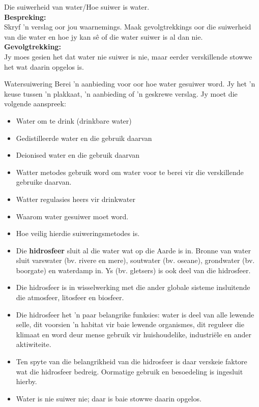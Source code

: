 \begin{g_experiment}{Die suiwerheid van water/Hoe suiwer is water.}
\\
\label{m38138*id3429827}\noindent{}\textbf{Bespreking:}\\
Skryf  'n verslag oor jou waarnemings. Maak gevolgtrekkings oor die suiwerheid van die water en hoe jy kan sê of die water suiwer is al dan nie.
\\  
\label{m38138*id68921}\noindent{}\textbf{Gevolgtrekking:}\\
Jy moes gesien het dat water nie suiwer is nie, maar eerder verskillende stowwe het wat daarin opgelos is.
\\
\end{g_experiment}
\label{m38138*id672214}
            \begin{project}{Watersuiwering}
            \nopagebreak
\label{m38138*id97324}
Berei  'n aanbieding voor oor hoe water gesuiwer word. Jy het  'n keuse tussen  'n plakkaat,  'n aanbieding of  'n geskrewe verslag. Jy moet die volgende aanspreek:
\label{m38138*id097324}\begin{itemize}[noitemsep]
            \item Water om te drink (drinkbare water)
\item Gedistilleerde water en die gebruik daarvan
\item Deionised water en die gebruik daarvan
\item Watter metodes gebruik word om water voor te berei vir die verskillende gebruike daarvan.
\item Watter regulasies heers vir drinkwater
\item Waarom water gesuiwer moet word.
\item Hoe veilig hierdie suiweringsmetodes is.
\end{itemize}
\par 
\end{project}


            \nopagebreak

\begin{itemize}[noitemsep]
\item Die \textbf{hidrosfeer} sluit al die water wat op die Aarde is in. Bronne van water sluit varswater (bv. rivere en mere), soutwater (bv. oseane), grondwater (bv. boorgate) en waterdamp in. Ys (bv. gletsers)  is ook deel van die hidrosfeer.
\label{m38138*uid93}\item Die hidrosfeer is in wisselwerking met die ander globale sisteme insluitende die atmosfeer, litosfeer en biosfeer.
\label{m38138*uid94}\item Die hidrosfeer het  'n paar belangrike funksies: water is deel van alle lewende selle, dit voorsien  'n habitat vir baie lewende organismes, dit reguleer die klimaat  en word deur mense gebruik  vir huishoudelike, industriële en ander aktiwiteite.
\label{m38138*uid106}\item Ten spyte van die belangrikheid van die hidrosfeer is daar verskeie faktore wat die hidrosfeer bedreig. Oormatige gebruik en besoedeling is ingesluit hierby.
\item Water is nie suiwer nie; daar is baie stowwe daarin opgelos.
\end{itemize}

